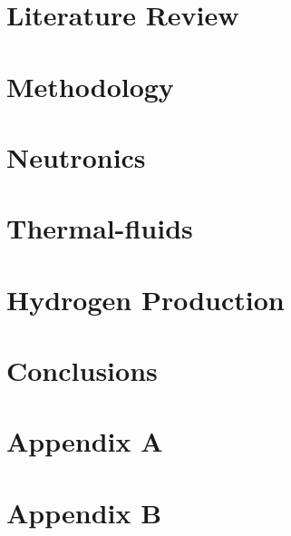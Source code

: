 \documentclass[edeposit,fullpage]{uiucthesis2018}
\begin{document}
\chapter{Literature Review}


\chapter{Methodology}


\chapter{Neutronics}


\chapter{Thermal-fluids}


\chapter{Hydrogen Production}


\chapter{Conclusions}


\chapter*{Appendix A}
\setcounter{chapter}{8}
\setcounter{section}{0}


\chapter*{Appendix B}
\setcounter{chapter}{9}
\setcounter{section}{0}


\backmatter

% 


\end{document}
